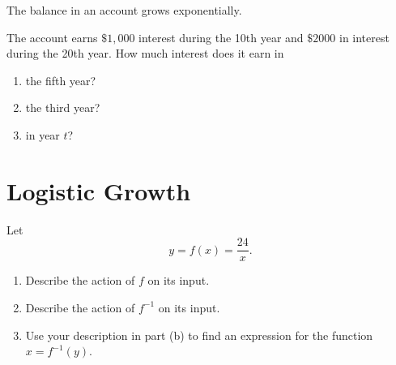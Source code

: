 \documentclass{ximera}
\begin{document}
\begin{question} \label{Q6319L}
The balance in an account grows exponentially.

The account earns $\$1,000$ interest during the 10th year and $\$2000$ in interest during the 20th year. How much interest does it earn in 
\begin{enumerate}
\item the fifth year?

\item the third year?

\item in year $t$?
\end{enumerate} \end{question}


\section{Logistic Growth}

\begin{question} \label{Q33332}
Let
\[
   y =  f(x) = \frac{24}{x} .
\]

\begin{enumerate}
\item Describe the action of $f$ on its input.

\item Describe the action of $f^{-1}$ on its input.

\item Use your description in part (b) to find an expression for the function $x=f^{-1}(y)$.
\end{enumerate}

\end{question}
\end{document}
